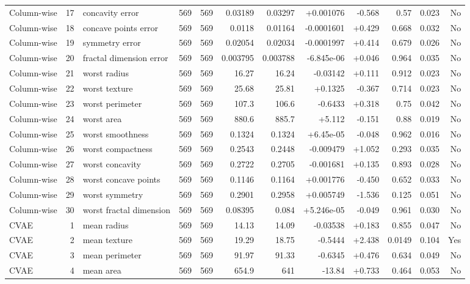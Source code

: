 \begin{landscape}
\begin{longtable}{@{}lrp{4.0cm}rrrrrrrrr@{}}
Column-wise & 17 & concavity error & 569 & 569 & 0.03189 & 0.03297 & +0.001076 & -0.568 & 0.57 & 0.023 & No \\
Column-wise & 18 & concave points error & 569 & 569 & 0.0118 & 0.01164 & -0.0001601 & +0.429 & 0.668 & 0.032 & No \\
Column-wise & 19 & symmetry error & 569 & 569 & 0.02054 & 0.02034 & -0.0001997 & +0.414 & 0.679 & 0.026 & No \\
Column-wise & 20 & fractal dimension error & 569 & 569 & 0.003795 & 0.003788 & -6.845e-06 & +0.046 & 0.964 & 0.035 & No \\
Column-wise & 21 & worst radius & 569 & 569 & 16.27 & 16.24 & -0.03142 & +0.111 & 0.912 & 0.023 & No \\
Column-wise & 22 & worst texture & 569 & 569 & 25.68 & 25.81 & +0.1325 & -0.367 & 0.714 & 0.023 & No \\
Column-wise & 23 & worst perimeter & 569 & 569 & 107.3 & 106.6 & -0.6433 & +0.318 & 0.75 & 0.042 & No \\
Column-wise & 24 & worst area & 569 & 569 & 880.6 & 885.7 & +5.112 & -0.151 & 0.88 & 0.019 & No \\
Column-wise & 25 & worst smoothness & 569 & 569 & 0.1324 & 0.1324 & +6.45e-05 & -0.048 & 0.962 & 0.016 & No \\
Column-wise & 26 & worst compactness & 569 & 569 & 0.2543 & 0.2448 & -0.009479 & +1.052 & 0.293 & 0.035 & No \\
Column-wise & 27 & worst concavity & 569 & 569 & 0.2722 & 0.2705 & -0.001681 & +0.135 & 0.893 & 0.028 & No \\
Column-wise & 28 & worst concave points & 569 & 569 & 0.1146 & 0.1164 & +0.001776 & -0.450 & 0.652 & 0.033 & No \\
Column-wise & 29 & worst symmetry & 569 & 569 & 0.2901 & 0.2958 & +0.005749 & -1.536 & 0.125 & 0.051 & No \\
Column-wise & 30 & worst fractal dimension & 569 & 569 & 0.08395 & 0.084 & +5.246e-05 & -0.049 & 0.961 & 0.030 & No \\
CVAE & 1 & mean radius & 569 & 569 & 14.13 & 14.09 & -0.03538 & +0.183 & 0.855 & 0.047 & No \\
CVAE & 2 & mean texture & 569 & 569 & 19.29 & 18.75 & -0.5444 & +2.438 & 0.0149 & 0.104 & Yes \\
CVAE & 3 & mean perimeter & 569 & 569 & 91.97 & 91.33 & -0.6345 & +0.476 & 0.634 & 0.049 & No \\
CVAE & 4 & mean area & 569 & 569 & 654.9 & 641 & -13.84 & +0.733 & 0.464 & 0.053 & No \\

\end{longtable}
\end{landscape}
